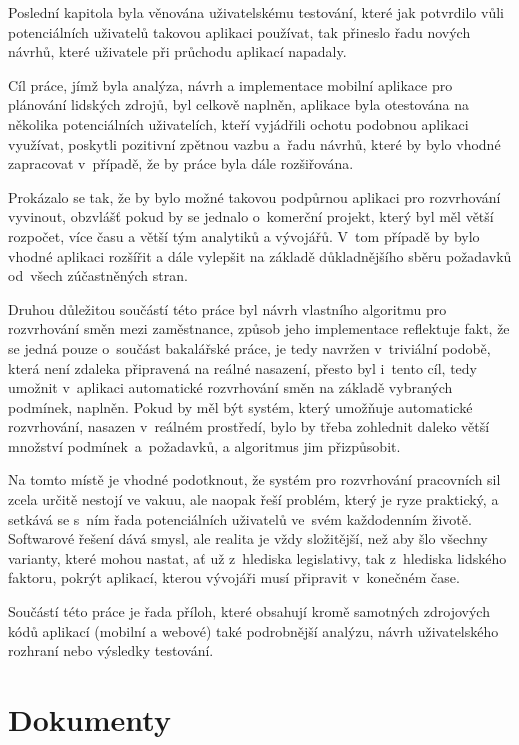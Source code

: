 \documentclass[twoside]{ctuthesis}
\begin{document}
Poslední kapitola byla věnována uživatelskému testování, které jak potvrdilo vůli potenciálních uživatelů takovou aplikaci používat, tak přineslo řadu nových návrhů, které uživatele při průchodu aplikací napadaly.

Cíl práce, jímž byla analýza, návrh a implementace mobilní aplikace pro plánování lidských zdrojů, byl celkově naplněn, aplikace byla otestována na několika potenciálních uživatelích, kteří vyjádřili ochotu podobnou aplikaci využívat, poskytli pozitivní zpětnou vazbu a~řadu návrhů, které by bylo vhodné zapracovat v~případě, že by práce byla dále rozšiřována.

Prokázalo se tak, že by bylo možné takovou podpůrnou aplikaci pro rozvrhování vyvinout, obzvlášť pokud by se jednalo o~komerční projekt, který byl měl větší rozpočet, více času a větší tým analytiků a vývojářů. V~tom případě by bylo vhodné aplikaci rozšířit a dále vylepšit na základě důkladnějšího sběru požadavků od~všech zúčastněných stran.

Druhou důležitou součástí této práce byl návrh vlastního algoritmu pro rozvrhování směn mezi zaměstnance, způsob jeho implementace reflektuje fakt, že se jedná pouze o~součást bakalářské práce, je tedy navržen v~triviální podobě, která není zdaleka připravená na reálné nasazení, přesto byl i~tento cíl, tedy umožnit v~aplikaci automatické rozvrhování směn na základě vybraných podmínek, naplněn. Pokud by měl být systém, který umožňuje automatické rozvrhování, nasazen v~reálném prostředí, bylo by třeba zohlednit daleko větší množství podmínek~a~požadavků, a algoritmus jim přizpůsobit.

Na tomto místě je vhodné podotknout, že systém pro rozvrhování pracovních sil zcela určitě nestojí ve vakuu, ale naopak řeší problém, který je ryze praktický, a setkává se s~ním řada potenciálních uživatelů ve~svém každodenním životě. Softwarové řešení dává smysl, ale realita je vždy složitější, než aby šlo všechny varianty, které mohou nastat, ať už z~hlediska legislativy, tak z~hlediska lidského faktoru, pokrýt aplikací, kterou vývojáři musí připravit v~konečném čase.

Součástí této práce je řada příloh, které obsahují kromě samotných zdrojových kódů aplikací (mobilní a webové) také podrobnější analýzu, návrh uživatelského rozhraní nebo výsledky testování.



\printbibliography[title={Seznam použité literatury}]

\appendix
\chapter{Dokumenty}
\end{document}
